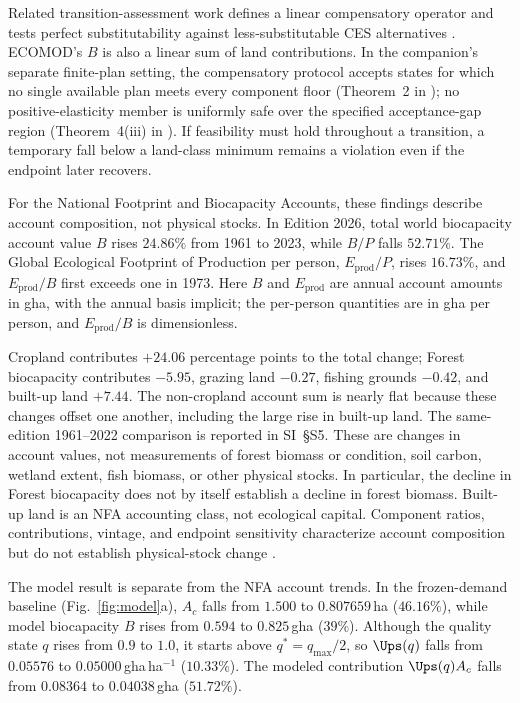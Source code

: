 Related transition-assessment work defines a linear compensatory operator and tests perfect substitutability against less-substitutable CES alternatives \citep[Sections~2 and 4 of][]{Abaee2026b}. ECOMOD's $B$ is also a linear sum of land contributions. In the companion's separate finite-plan setting, the compensatory protocol accepts states for which no single available plan meets every component floor (Theorem~2 in \citet{Abaee2026b}); no positive-elasticity member is uniformly safe over the specified acceptance-gap region (Theorem~4(iii) in \citet{Abaee2026b}). If feasibility must hold throughout a transition, a temporary fall below a land-class minimum remains a violation even if the endpoint later recovers.

For the National Footprint and Biocapacity Accounts, these findings describe account composition, not physical stocks. In Edition 2026, total world biocapacity account value $B$ rises $24.86\%$ from 1961 to 2023, while $B/P$ falls $52.71\%$. The Global Ecological Footprint of Production per person, $E_{\mathrm{prod}}/P$, rises $16.73\%$, and $E_{\mathrm{prod}}/B$ first exceeds one in 1973. Here $B$ and $E_{\mathrm{prod}}$ are annual account amounts in gha, with the annual basis implicit; the per-person quantities are in gha per person, and $E_{\mathrm{prod}}/B$ is dimensionless.

Cropland contributes $+24.06$ percentage points to the total change; Forest biocapacity contributes $-5.95$, grazing land $-0.27$, fishing grounds $-0.42$, and built-up land $+7.44$. The non-cropland account sum is nearly flat because these changes offset one another, including the large rise in built-up land. The same-edition 1961--2022 comparison is reported in SI~\S S5. These are changes in account values, not measurements of forest biomass or condition, soil carbon, wetland extent, fish biomass, or other physical stocks. In particular, the decline in Forest biocapacity does not by itself establish a decline in forest biomass. Built-up land is an NFA accounting class, not ecological capital. Component ratios, contributions, vintage, and endpoint sensitivity characterize account composition but do not establish physical-stock change \citep{Lo2026NFA,Borucke2013,Blomqvist2013,GiampietroSaltelli2014,Galli2016,vdBerghGrazi2015}.

The model result is separate from the NFA account trends. In the frozen-demand baseline (Fig.~\ref{fig:model}a), $A_c$ falls from $1.500$ to $0.807659$\,ha ($46.16\%$), while model biocapacity $B$ rises from $0.594$ to $0.825$\,gha ($39\%$). Although the quality state $q$ rises from $0.9$ to $1.0$, it starts above $q^*=q_{\max}/2$, so $\Ups(q)$ falls from $0.05576$ to $0.05000$\,gha\,ha$^{-1}$ ($10.33\%$). The modeled contribution $\Ups(q)A_c$ falls from $0.08364$ to $0.04038$\,gha ($51.72\%$).

